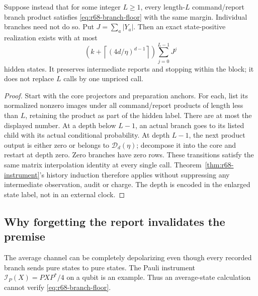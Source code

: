 \begin{theorem}\label{thm:r68-block}
Suppose instead that for some integer $L\ge1$, every length-$L$ command/report branch product satisfies \eqref{eq:r68-branch-floor} with the same margin. Individual branches need not do so. Put $J=\sum_a|Y_a|$. Then an exact state-positive realization exists with at most
\begin{equation}\label{eq:r68-block-count}
 \left(k+\left\lceil(4d/\eta)^{d-1}\right\rceil\right)
                        \sum_{j=0}^{L-1}J^j
\end{equation}
hidden states. It preserves intermediate reports and stopping within the block; it does not replace $L$ calls by one unpriced call.
\end{theorem}
\begin{proof}
Start with the core projectors and preparation anchors. For each, list its normalized nonzero images under all command/report products of length less than $L$, retaining the product as part of the hidden label. There are at most the displayed number. At a depth below $L-1$, an actual branch goes to its listed child with its actual conditional probability. At depth $L-1$, the next product output is either zero or belongs to $\mathcal D_d(\eta)$; decompose it into the core and restart at depth zero. Zero branches have zero rows. These transitions satisfy the same matrix interpolation identity at every single call. Theorem~\ref{thm:r68-instrument}'s history induction therefore applies without suppressing any intermediate observation, audit or charge. The depth is encoded in the enlarged state label, not in an external clock.
\end{proof}

\subsection{Why forgetting the report invalidates the premise}
The average channel can be completely depolarizing even though every recorded branch sends pure states to pure states. The Pauli instrument $\mathcal I_P(X)=PXP^*/4$ on a qubit is an example. Thus an average-state calculation cannot verify \eqref{eq:r68-branch-floor}.

